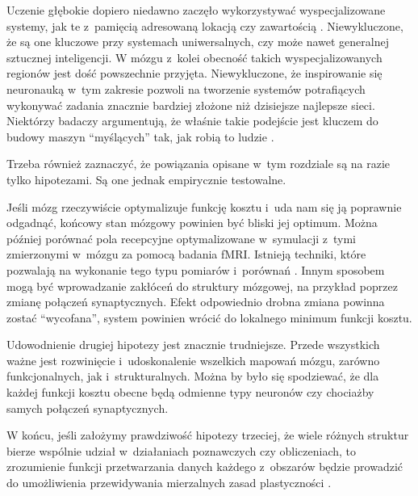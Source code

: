 Uczenie głębokie dopiero niedawno zaczęło wykorzystywać wyspecjalizowane systemy, jak te z~pamięcią adresowaną lokacją czy zawartością \cite{graves2014neural}.
Niewykluczone, że są one kluczowe przy systemach uniwersalnych, czy może nawet generalnej sztucznej inteligencji.
W mózgu z~kolei obecność takich wyspecjalizowanych regionów jest dość powszechnie przyjęta.
Niewykluczone, że inspirowanie się neuronauką w~tym zakresie pozwoli na tworzenie systemów potrafiących wykonywać zadania znacznie bardziej złożone niż dzisiejsze najlepsze sieci.
Niektórzy badaczy argumentują, że właśnie takie podejście jest kluczem do budowy maszyn ``myślących'' tak, jak robią to ludzie \cite{lake2017building}.

Trzeba również zaznaczyć, że powiązania opisane w~tym rozdziale są na razie tylko hipotezami.
Są one jednak empirycznie testowalne.

Jeśli mózg rzeczywiście optymalizuje funkcję kosztu i~uda nam się ją poprawnie odgadnąć, końcowy stan mózgowy powinien być bliski jej optimum.
Można później porównać pola recepcyjne optymalizowane w~symulacji z~tymi zmierzonymi w~mózgu za pomocą badania fMRI.
Istnieją techniki, które pozwalają na wykonanie tego typu pomiarów i~porównań \cite{dumoulin2008population}.
Innym sposobem mogą być wprowadzanie zakłóceń do struktury mózgowej, na przykład poprzez zmianę połączeń synaptycznych.
Efekt odpowiednio drobna zmiana powinna zostać ``wycofana'', system powinien wrócić do lokalnego minimum funkcji kosztu.

Udowodnienie drugiej hipotezy jest znacznie trudniejsze.
Przede wszystkich ważne jest rozwinięcie i~udoskonalenie wszelkich mapowań mózgu, zarówno funkcjonalnych, jak i~strukturalnych.
Można by było się spodziewać, że dla każdej funkcji kosztu obecne będą odmienne typy neuronów czy chociażby samych połączeń synaptycznych.

W końcu, jeśli założymy prawdziwość hipotezy trzeciej, że wiele różnych struktur bierze wspólnie udział w~działaniach poznawczych czy obliczeniach, to zrozumienie funkcji przetwarzania danych każdego z~obszarów będzie prowadzić do umożliwienia przewidywania mierzalnych zasad plastyczności \cite{marblestone2016toward}.
